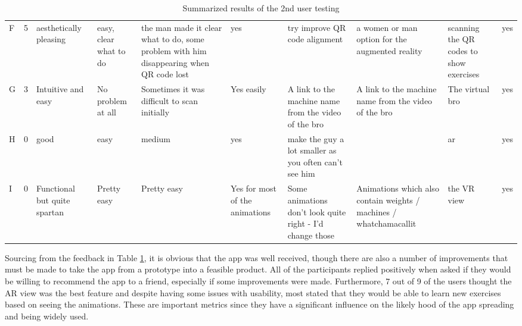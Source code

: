 \documentclass{l4proj}
\begin{document}
\begin{landscape}
\begin{table}[ht]
{\begin{tabular}{p{0.5cm}p{1cm}p{2cm}p{3cm}p{3cm}p{3cm}p{3cm}p{3cm}p{3cm}p{2cm}}
F & 5 & aesthetically pleasing & easy, clear what to do & the man made it clear what to do, some problem with him disappearing when QR code lost & yes & try improve QR code alignment & a women or man option for the augmented reality & scanning the QR codes to show exercises & yes \\
G & 3 & Intuitive and easy & No problem at all & Sometimes it was difficult to scan initially & Yes easily & A link to the machine name from the video of the bro & A link to the machine name from the video of the bro & The virtual bro & yes \\
H & 0 & good & easy & medium & yes & make the guy a lot smaller as you often can't see him &  & ar & yes \\
I & 0 & Functional but quite spartan & Pretty easy & Pretty easy & Yes for most of the animations & Some animations don't look quite right - I'd change those & Animations which also contain weights / machines / whatchamacallit & the VR view & yes
\end{tabular}}
\caption{Summarized results of the 2nd user testing}
\label{tbl:2ndtest}
\end{table}
\end{landscape}


Sourcing from the feedback in Table \ref{tbl:2ndtest}, it is obvious that the app was well received, though there are also a number of improvements that must be made to take the app from a prototype into a feasible product. All of the participants replied positively when asked if they would be willing to recommend the app to a friend, especially if some improvements were made. Furthermore, 7 out of 9 of the users thought the AR view was the best feature and despite having some issues with usability, most stated that they would be able to learn new exercises based on seeing the animations. These are important metrics since they have a significant influence on the likely hood of the app spreading and being widely used.
\end{document}
